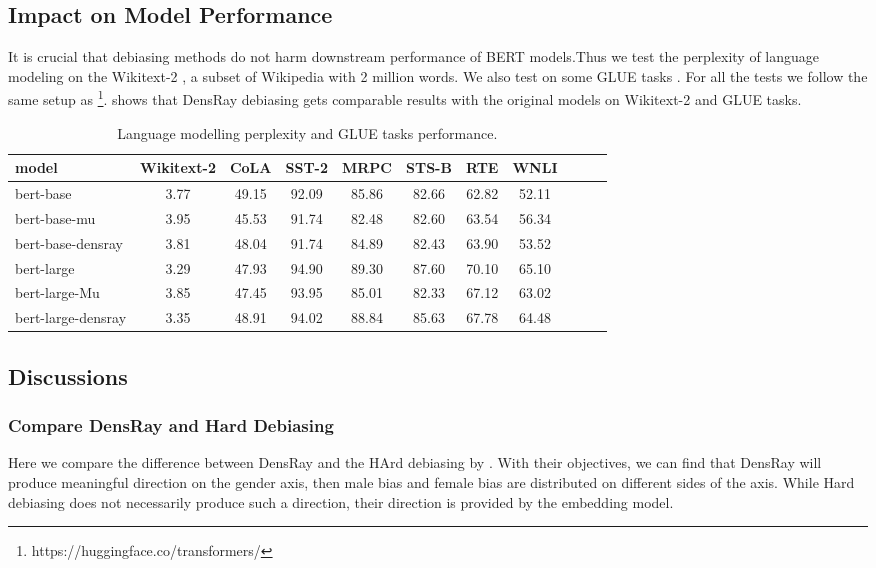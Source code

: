\subsection{Impact on Model Performance}
It is crucial that debiasing methods do not harm downstream performance of BERT models.Thus we test the perplexity of language modeling on the Wikitext-2 \citep{merity2016pointer}, a subset of Wikipedia with 2 million words. We also test on some GLUE tasks \citep{wang2018glue}. For all the tests we follow the same setup as \citet{wolf2019huggingfaces}\footnote{https://huggingface.co/transformers/}.  shows that DensRay debiasing gets comparable results with the original models on Wikitext-2 and GLUE tasks.
\begin{table}[ht]
\centering
\footnotesize
\begin{tabular}{lcccccccccc}
\hline
model & Wikitext-2&CoLA &SST-2&MRPC&STS-B&RTE&WNLI\\
\hline
bert-base &3.77&49.15&92.09&85.86&82.66&62.82&52.11\\
bert-base-mu &3.95&45.53&91.74&82.48&82.60&63.54&56.34\\
bert-base-densray &3.81&48.04&91.74&84.89&82.43&63.90&53.52\\
\hline
bert-large &3.29& 47.93&94.90&89.30&87.60&70.10&65.10\\
bert-large-Mu &3.85& 47.45&93.95&85.01&82.33&67.12&63.02\\
bert-large-densray &3.35& 48.91&94.02&88.84&85.63&67.78&64.48\\
\hline
\end{tabular}
\caption{
Language modelling perplexity and GLUE tasks performance.}
\end{table}
\subsection{Discussions}
\subsubsection{Compare DensRay and Hard Debiasing}
Here we compare the difference between DensRay and the HArd debiasing by \citep{mu2018all}. With their objectives, we can find that DensRay will produce meaningful direction on the gender axis, then male bias and female bias are distributed on different sides of the axis. While Hard debiasing does not necessarily produce such a direction, their direction is provided by the embedding model.
